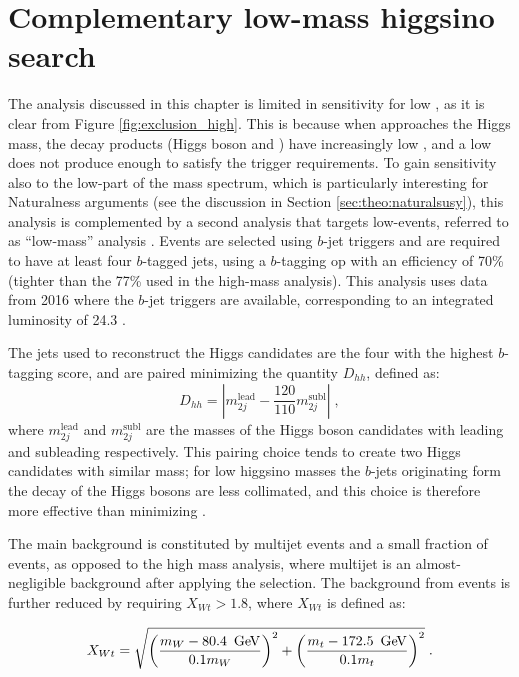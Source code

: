 \section{Complementary low-mass higgsino search}
\label{sec:ewk:LM}

The analysis discussed in this chapter is limited in sensitivity for low \mhino, as it is clear from Figure \ref{fig:exclusion_high}. 
This is because when \mhino approaches the Higgs mass, the decay products (Higgs boson and \gravino)
have increasingly low \pt, and a low \pt \gravino does not produce enough \met to satisfy the \met trigger requirements.  
To gain sensitivity also to the low-\mhino part of the mass spectrum, which is particularly interesting for Naturalness arguments (see the 
discussion in Section \ref{sec:theo:naturalsusy}), 
this analysis is complemented by a second analysis that targets low-\met events, referred to as ``low-mass'' analysis \cite{Aaboud:2018htj}. 
Events are selected using $b$-jet triggers and are required to have at least four $b$-tagged jets, 
using a $b$-tagging \gls{op} with an efficiency of 70\%
(tighter than the 77\% used in the high-mass analysis).
This analysis uses data from 2016 where the $b$-jet triggers are available, corresponding to an integrated luminosity of 24.3 \ifb.

The jets used to reconstruct the Higgs candidates are the four with the highest $b$-tagging score, and are paired minimizing the quantity 
$D_{hh}$, defined as:
\begin{equation}
  D_{hh} = \left|m_{2j}^\textrm{lead} - \frac{120}{110}m_{2j}^\textrm{subl}\right| \; , \nonumber
\end{equation}
where $m_{2j}^\textrm{lead}$ and $m_{2j}^\textrm{subl}$ are the masses of the Higgs boson candidates with leading and subleading \pt respectively.
This pairing choice tends to create two Higgs candidates with similar mass; 
for low higgsino masses the $b$-jets originating form the decay of the Higgs bosons are less collimated, 
and this choice is therefore more effective than minimizing \dRmax. 

The main background is constituted by multijet events and a small fraction of \ttbar events, as opposed to the
high mass analysis, where multijet is an almost-negligible background after applying the \dphimin selection. 
The background from \ttbar events is further reduced by requiring $X_{Wt}>1.8$, where $X_{Wt}$ is defined as:

\begin{equation}
 X_{Wt} = \sqrt{\left( \frac{m_W - 80.4\,\ \gev}{0.1  m_W} \right)^2 + \left( \frac{m_t - 172.5\,\ \gev}{0.1  m_t} \right)^2 } \;. \nonumber
\end{equation}


